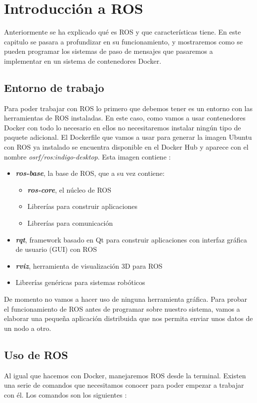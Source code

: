 \chapter{Introducción a ROS}
Anteriormente se ha explicado qué es ROS y que características tiene. En este capitulo se pasara a profundizar en su funcionamiento, y mostraremos como se pueden programar los sistemas de paso de mensajes que pasaremos a implementar en un sistema de contenedores Docker.

	\section{Entorno de trabajo}
	Para poder trabajar con ROS lo primero que debemos tener es un entorno con las herramientas de ROS instaladas. En este caso, como vamos a usar contenedores Docker con todo lo necesario en ellos no necesitaremos instalar ningún tipo de paquete adicional. El Dockerfile que vamos a usar para generar la imagen Ubuntu con ROS ya instalado se encuentra disponible en el Docker Hub y aparece con el nombre \emph{osrf/ros:indigo-desktop}. Esta imagen contiene \cite{ros-installation}:
	\begin{itemize}
		\item \emph{\textbf{ros-base}}, la base de ROS, que a su vez contiene:
		\begin{itemize}
			\item \emph{\textbf{ros-core}}, el núcleo de ROS
			\item Librerías para construir aplicaciones
			\item Librerías para comunicación
		\end{itemize}
		\item \emph{\textbf{rqt}}, framework basado en Qt para construir aplicaciones con interfaz gráfica de usuario (GUI) con ROS
		\item \emph{\textbf{rviz}}, herramienta de visualización 3D para ROS
		\item Librerías genéricas para sistemas robóticos
	\end{itemize}
	
	De momento no vamos a hacer uso de ninguna herramienta gráfica. Para probar el funcionamiento de ROS antes de programar sobre nuestro sistema, vamos a elaborar una pequeña aplicación distribuida que nos permita enviar unos datos de un nodo a otro.
	
	\section{Uso de ROS}
	Al igual que hacemos con Docker, manejaremos ROS desde la terminal. Existen una serie de comandos que necesitamos conocer para poder empezar a trabajar con él. Los comandos son los siguientes \cite{ros-comandos}:
	
